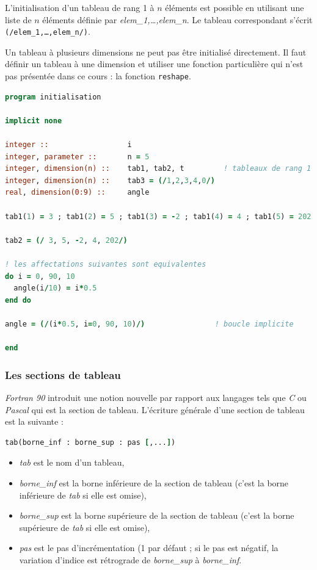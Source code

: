 \documentclass[a4paper,twoside]{article}
\begin{document}
L'initialisation d'un tableau de rang 1 à $n$ éléments est possible en utilisant une liste de $n$ éléments définie par \emph{elem\_1,\ldots,elem\_n}. Le tableau correspondant s'écrit \texttt{(/elem\_1,\ldots,elem\_n/)}. 

Un tableau à plusieurs dimensions ne peut pas être initialisé directement. Il faut définir un tableau à une dimension et utiliser une fonction particulière qui n'est pas présentée dans ce cours : la fonction \texttt{reshape}.
 
\begin{lstlisting}[language=Fortran]
program initialisation

implicit none

integer ::                  i
integer, parameter ::       n = 5
integer, dimension(n) ::    tab1, tab2, t         ! tableaux de rang 1
integer, dimension(n) ::    tab3 = (/1,2,3,4,0/)
real, dimension(0:9) ::     angle

tab1(1) = 3 ; tab1(2) = 5 ; tab1(3) = -2 ; tab1(4) = 4 ; tab1(5) = 202

tab2 = (/ 3, 5, -2, 4, 202/)

! les affectations suivantes sont equivalentes
do i = 0, 90, 10
  angle(i/10) = i*0.5
end do

angle = (/(i*0.5, i=0, 90, 10)/)                ! boucle implicite

end
\end{lstlisting}

\subsubsection{Les sections de tableau}

\emph{Fortran 90} introduit une notion nouvelle par rapport aux langages tels 
que \emph{C} ou \emph{Pascal} qui est la section de tableau. 
L'écriture générale d'une section de tableau est la suivante :
\begin{lstlisting}[language=Fortran]
tab(borne_inf : borne_sup : pas [,...])
\end{lstlisting}


\begin{itemize}
\item \emph{tab} est le nom d'un tableau,
\item \emph{borne\_inf} est la borne inférieure de la section de tableau (c'est la borne inférieure de \emph{tab} si elle est omise), 
\item \emph{borne\_sup} est la borne supérieure de la section de tableau (c'est la borne supérieure de \emph{tab} si elle est omise),
\item \emph{pas} est le pas d'incrémentation (1 par défaut ; si le pas est négatif, la variation d'indice est rétrograde de \emph{borne\_sup} à \emph{borne\_inf}.
\end{itemize}
\end{document}
